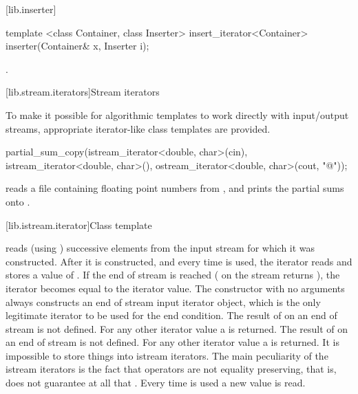 [lib.inserter]{}

%
\begin{itemdecl}
template <class Container, class Inserter>
  insert_iterator<Container> inserter(Container& x, Inserter i);
\end{itemdecl}

\begin{itemdescr}
\pnum
\returns
{}.
\end{itemdescr}

[lib.stream.iterators]{Stream iterators}

\pnum
To make it possible for algorithmic templates to work directly with input/output streams, appropriate
iterator-like
class templates
are provided.

\pnum
\enterexample
\begin{codeblock}
partial_sum_copy(istream_iterator<double, char>(cin),
  istream_iterator<double, char>(),
  ostream_iterator<double, char>(cout, "@\textbackslash@n"));
\end{codeblock}

reads a file containing floating point numbers from
,
and prints the partial sums onto
.
\exitexampleb

[lib.istream.iterator]{Class template }

\pnum
{}%
reads (using
)
successive elements from the input stream for which it was constructed.
After it is constructed, and every time
\tcode{++}
is used, the iterator reads and stores a value of
.
If the end of stream is reached (
 on the stream returns ),
the iterator becomes equal to the
iterator value.
The constructor with no arguments
always constructs
an end of stream input iterator object, which is the only legitimate iterator to be used
for the end condition.
The result of
on an end of stream is not defined.
For any other iterator value a
is returned.
The result of
on an end of stream is not defined.
For any other iterator value a
is returned.
It is impossible to store things into istream iterators.
The main peculiarity of the istream iterators is the fact that
\tcode{++} operators are not equality preserving, that is,
 does not guarantee at all that .
Every time \tcode{++} is used a new value is read.

